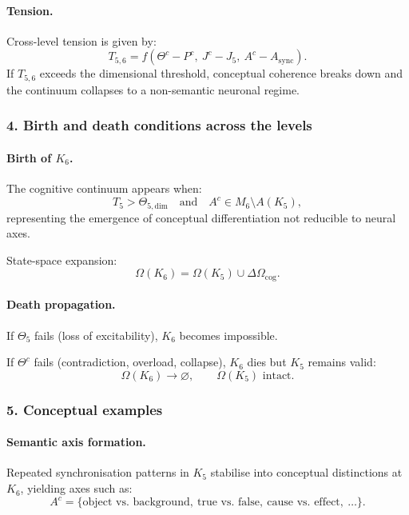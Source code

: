 \paragraph{Tension.}
Cross-level tension is given by:
\[
T_{5,6} = f(\Theta^{c} - P^{c},\ J^{c} - J_5,\ A^{c} - A_{\mathrm{sync}}).
\]
If $T_{5,6}$ exceeds the dimensional threshold, conceptual coherence
breaks down and the continuum collapses to a non-semantic neuronal regime.

\subsubsection{4. Birth and death conditions across the levels}

\paragraph{Birth of \texorpdfstring{$K_6$}{K_6}.}
The cognitive continuum appears when:
\[
T_5 > \Theta_{5,\mathrm{dim}}
\quad\text{and}\quad
A^{c} \in M_6 \setminus A(K_5),
\]
representing the emergence of conceptual differentiation not reducible to
neural axes.

State-space expansion:
\[
\Omega(K_6) = \Omega(K_5) \cup \Delta\Omega_{\mathrm{cog}}.
\]

\paragraph{Death propagation.}
If $\Theta_5$ fails (loss of excitability), $K_6$ becomes impossible.

If $\Theta^{c}$ fails (contradiction, overload, collapse), $K_6$ dies but
$K_5$ remains valid:
\[
\Omega(K_6) \rightarrow \varnothing,
\qquad
\Omega(K_5) \text{ intact}.
\]

\subsubsection{5. Conceptual examples}

\paragraph{Semantic axis formation.}
Repeated synchronisation patterns in $K_5$ stabilise into conceptual
distinctions at $K_6$, yielding axes such as:
\[
A^{c} = \{\text{object vs. background},\ \text{true vs. false},\
         \text{cause vs. effect},\ \ldots\}.
\]

